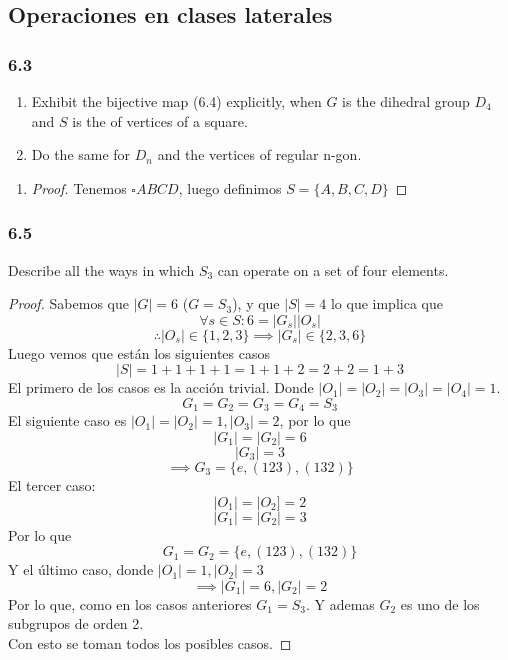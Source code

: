 \documentclass[11pt]{article}
\theoremstyle{definition}
\begin{document}
\subsection{Operaciones en clases laterales}
\subsubsection{6.3}
\begin{enumerate}[label=(\alph*)]
    \item Exhibit the bijective map (6.4) explicitly, when $G$ is the dihedral group $D_4$ and $S$ is the of vertices of a square.

    \item Do the same for $D_n$ and the vertices of regular n-gon.
\end{enumerate}
\begin{enumerate}[label=(\alph*)]
    \item \begin{proof}
        Tenemos $\square ABCD$, luego definimos $S=\{A,B,C,D\}$
    \end{proof}
\end{enumerate}
\subsubsection{6.5}
Describe all the ways in which $S_3$ can operate on a set of four elements.
\begin{proof}
    Sabemos que $|G|=6$ ($G=S_3$), y que $|S|=4$ lo que implica que
    \[\forall s\in S:6=|G_s||O_s|\]
    \[\therefore |O_s|\in\{1,2,3\}\implies |G_s|\in\{2,3,6\}\]
    Luego vemos que están los siguientes casos
    \[|S|=1+1+1+1=1+1+2=2+2=1+3\]
    El primero de los casos es la acción trivial. Donde $|O_1|=|O_2|=|O_3|=|O_4|=1$.
    \[G_1=G_2=G_3=G_4=S_3\]
    El siguiente caso es $|O_1|=|O_2|=1,|O_3|=2$, por lo que
    \[|G_1|=|G_2|=6\]
    \[|G_3|=3\]
    \[\implies G_3=\{e,(123),(132)\}\]
    El tercer caso:
    \[|O_1|=|O_2]=2\]
    \[|G_1|=|G_2|=3\]
    Por lo que
    \[G_1=G_2=\{e,(123),(132)\}\]
    Y el último caso, donde $|O_1|=1,|O_2|=3$
    \[\implies |G_1|=6,|G_2|=2\]
    Por lo que, como en los casos anteriores $G_1=S_3$. Y ademas $G_2$ es uno de los subgrupos de orden 2.\\
    Con esto se toman todos los posibles casos.
\end{proof}
\end{document}
